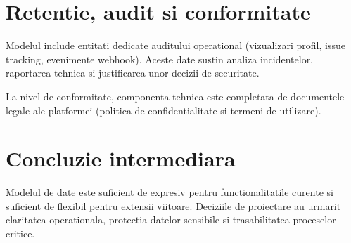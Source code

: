 \section{Retentie, audit si conformitate}

Modelul include entitati dedicate auditului operational (vizualizari profil, issue tracking, evenimente webhook). Aceste date sustin analiza incidentelor, raportarea tehnica si justificarea unor decizii de securitate.

La nivel de conformitate, componenta tehnica este completata de documentele legale ale platformei (politica de confidentialitate si termeni de utilizare).

\section{Concluzie intermediara}

Modelul de date este suficient de expresiv pentru functionalitatile curente si suficient de flexibil pentru extensii viitoare. Deciziile de proiectare au urmarit claritatea operationala, protectia datelor sensibile si trasabilitatea proceselor critice.
